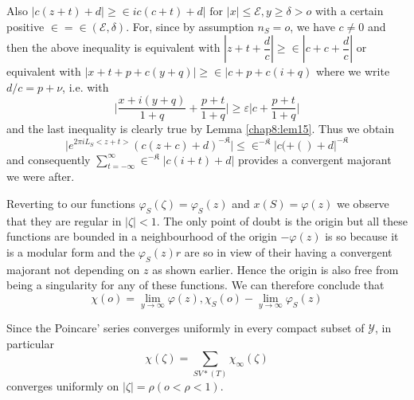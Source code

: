 Also $| c (z + t) +d | \ge \in i c(c + t)+ d | \text { for } | x | \le
\mathscr{E}, y \ge \delta > o$ with a certain positive $\in = \in
(\mathscr{E}, \delta)$. For, since by assumption $n_S  = o$, we have
$c \neq 0$ and then the above inequality is equivalent with $ | z + t
+ \dfrac{d}{c} | \ge \in | c + c + \dfrac{d}{c} |$ or equivalent with
$| x + t + p + c (y + q) | \ge \in | c + p + c(i + q)$ where we write
$d/c = p + \nu $, i.e. with 
$$ 
\big | \frac{x + i (y + q)}{ 1 + q} + \frac{p + t}{1 + q} \big | \ge
\varepsilon \big | c + \frac{p + t}{1 + q} \big| 
$$\pageoriginale 
and the last inequality is clearly true by Lemma
\ref{chap8:lem15}. Thus we obtain     
$$
\big | e^{2 \pi i L_S< z + t>} (c (z + c) +d)^{- \mathfrak{K}} \big |
\le \in ^{-\mathfrak{K}} | c ( + () + d |^{- \mathfrak{K}} 
$$
and consequently $\sum\limits_{t = - \infty}^{\infty} \in ^{-
  \mathfrak{K}} | c (i + t)+ d|$ provides a convergent majorant we
were after. 

Reverting to our functions $\varphi_S(\zeta)= \varphi_S (z)$ and $x
(S) = \varphi(z)$ we observe that they are regular in $| \zeta | <
1$. The only point of doubt is the origin but all these functions are
bounded in a neighbourhood of the origin $- \varphi(z) $ is so because
it is a modular form and the $\varphi_S (z) r$ are so in view of their
having a convergent majorant not depending on $z$ as shown
earlier. Hence the origin is also free from being a singularity for any of
these functions. We can therefore conclude that 
\begin{equation*}
\chi (o) = \lim_{y \to \infty} \varphi (z), \chi_S(o) - \lim_{y \to
  \infty} \varphi_S (z) \tag{184}\label{eq184}  
\end{equation*}

Since the Poincare' series converges uniformly in every compact subset
of $\mathscr{Y}$, in particular 
$$
\chi (\zeta) = \sum_{S V*(T)} \chi_\infty (\zeta)
$$
converges uniformly on $| \zeta | = \rho (o < \rho < 1)$.

